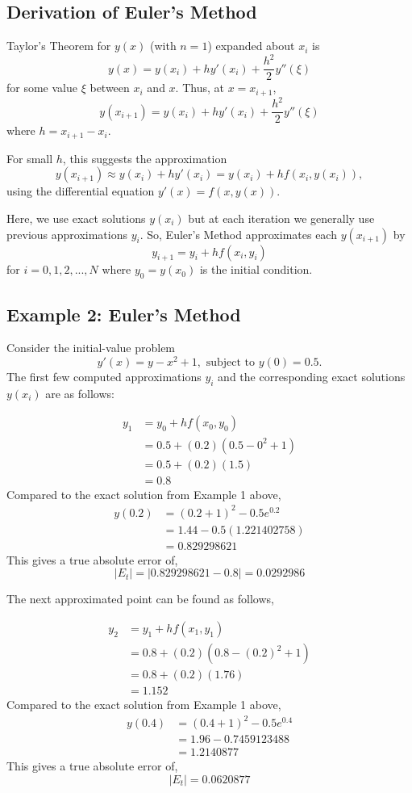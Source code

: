 \documentclass [titlepage,12pt,letter] {article}
\begin{document}
\subsection{Derivation of Euler's Method}

Taylor's Theorem for $y(x)$ (with $n=1$) expanded about $x_i$ is
\[
y(x)=y(x_i)+hy'(x_i)+\frac{h^2}{2}y''(\xi)
 \]
for some value $\xi$ between $x_i$ and $x$.  Thus, at $x=x_{i+1}$,
\[
y(x_{i+1})=y(x_i)+hy'(x_i)+\frac{h^2}{2}y''(\xi)
\]
where $h=x_{i+1}-x_i$.

For small $h$, this suggests the approximation
\[
y(x_{i+1}) \approx y(x_i)+hy'(x_i)
=y(x_i)+hf(x_i,y(x_i)),
 \]
using the differential equation $y'(x)=f(x,y(x))$. 

Here, we use exact solutions $y(x_i)$ but at each iteration we generally use previous approximations $y_i$. So, Euler's Method approximates each $y(x_{i+1})$ by
\[
y_{i+1}=y_i+hf(x_i,y_i)
\]
for $i=0,1,2,...,N$ where $y_0=y(x_0)$ is the initial condition.

\subsection{Example 2: Euler's Method}

Consider the initial-value problem
\[
y'(x)=y-x^2+1, \text{ subject to } y(0)=0.5.
\]
The first few computed approximations $y_i$ and the corresponding exact solutions $y(x_i)$ are as follows:

\begin{align*}
y_1&=y_0+hf(x_0,y_0) \\
&=0.5+(0.2)(0.5-0^2+1) \\
&=0.5+(0.2)(1.5) \\
&=0.8
\end{align*}
Compared to the exact solution from Example 1 above,
\begin{align*}
y(0.2)&=(0.2+1)^2-0.5e^{0.2} \\
&=1.44-0.5(1.221402758) \\
&=0.829298621
\end{align*}
This gives a true absolute error of,
\[|E_t|=|0.829298621-0.8|=0.0292986\]

The next approximated point can be found as follows,

\begin{align*}
y_2&=y_1+hf(x_1,y_1) \\
&=0.8+(0.2)(0.8-(0.2)^2+1) \\
&=0.8+(0.2)(1.76) \\
&=1.152
\end{align*}
Compared to the exact solution from Example 1 above,
\begin{align*}
y(0.4)&=(0.4+1)^2-0.5e^{0.4} \\
&=1.96-0.7459123488 \\
&=1.2140877
\end{align*}
This gives a true absolute error of,
\[|E_t|=0.0620877\]
\end{document}
